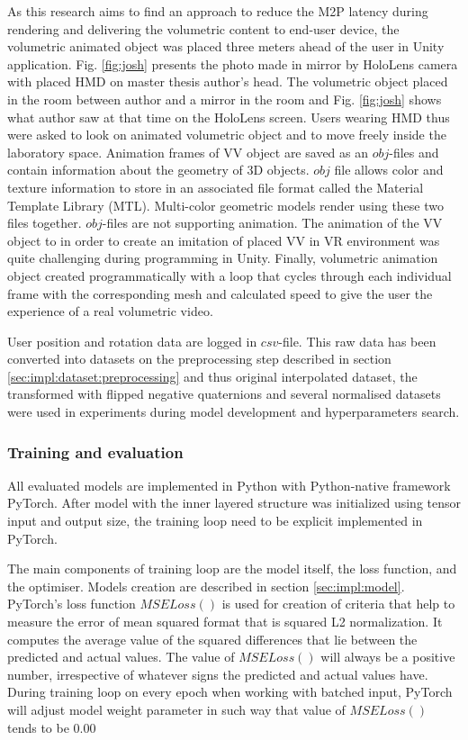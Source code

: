 As this research aims to find an approach to reduce the M2P latency during rendering and delivering the volumetric content to end-user device, the volumetric animated object was placed three meters ahead of the user in Unity application. Fig. \ref{fig:josh} presents the photo made in mirror by HoloLens camera with placed HMD on master thesis author's head. The volumetric object placed in the room between author and a mirror in the room and Fig. \ref{fig:josh} shows what author saw at that time on the HoloLens screen. Users wearing HMD thus were asked to look on animated volumetric object and to move freely inside the laboratory space. Animation frames of VV object are saved as an $obj$-files and contain information about the geometry of 3D objects. $obj$ file allows color and texture information to store in an associated file format called the Material Template Library (MTL). Multi-color geometric models render using these two files together. $obj$-files are not supporting animation. The animation of the VV object to in order to create an imitation of placed VV in VR environment was quite challenging during programming in Unity. Finally, volumetric animation object created programmatically with a loop that cycles through each individual frame with the corresponding mesh and calculated speed to give the user the experience of a real volumetric video.

User position and rotation data are logged in $csv$-file. This raw data has been converted into datasets on the preprocessing step described in section \ref{sec:impl:dataset:preprocessing} and thus original interpolated dataset, the transformed with flipped negative quaternions and several normalised datasets were used in experiments during model development and hyperparameters search.


\subsubsection{Training and evaluation}
\label{sec:impl:model:dev:programming}
All evaluated models are implemented in Python with Python-native framework PyTorch. After model with the inner layered structure was initialized using tensor input and output size, the training loop need to be explicit implemented in PyTorch. 

The main components of training loop are the model itself, the loss function, and the optimiser. Models creation are described in section \ref{sec:impl:model}. PyTorch's loss function $MSELoss()$ is used for creation of criteria that help to measure the error of mean squared format that is squared L2 normalization. It computes the average value of the squared differences that lie between the predicted and actual values. The value of $MSELoss()$ will always be a positive number, irrespective of whatever signs the predicted and actual values have. During training loop on every epoch when working with batched input, PyTorch will adjust model weight parameter in such way that value of $MSELoss()$ tends to be 0.00

